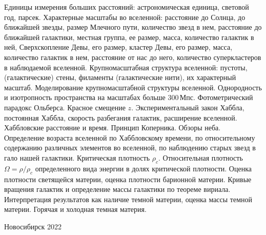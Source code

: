 \documentclass[12pt,pagesize,paper=192mm:108mm,landscape]{scrbook}
\begin{document}
\begin{titlepage}
  \vspace*{-0.5em}
  \begin{center}    

    



     \vfill

     \normalsize
     \begin{minipage}{0.95\linewidth}
       Единицы измерения больших расстояний: астрономическая единица,
       световой год, парсек. Характерные масштабы во вселенной:
       расстояние до Солнца, до ближайшей звезды, размер Млечного
       пути, количество звезд в нем, расстояние до ближайшей
       галактики, местная группа, ее размер, масса, количество
       галактик в ней, Сверхскопление Девы, его размер, кластер Девы,
       его размер, масса, количество галактик в нем, расстояние от нас
       до него, количество суперкластеров в наблюдаемой
       вселенной. Крупномасштабная структура вселенной: пустоты,
       (галактические) стены, филаменты (галактические нити), их
       характерный масштаб. Моделирование крупномасштабной структуры
       вселенной. Однородность и изотропность пространства на
       масштабах больше 300\,Мпс. Фотометрический парадокс
       Ольберса. Красное смещение $z$. Экспериментальный закон Хаббла,
       постоянная Хаббла, скорость разбегания галактик, расширение
       вселенной. Хаббловские расстояние и время. Принцип
       Коперника. Обзоры неба. Определение возраста вселенной по
       Хаббловскому времени, по относительному содержанию различных
       элементов во вселенной, по наблюдению старых звезд в гало нашей
       галактики. Критическая плотность $\rho_c$. Относительная
       плотность $\Omega=\rho/\rho_c$ определенного вида энергии в
       долях критической плотности. Оценка плотности светящейся
       материи, оценка плотности барионной материи. Кривые вращения
       галактик и определение массы галактики по теореме
       вириала. Интерпретация результатов как наличие темной материи,
       оценка массы темной материи. Горячая и холодная темная материя.
    \end{minipage}
    \vfill

    \normalsize \ccbysa\hspace{0.5em}  Новосибирск 2022
  \end{center}
\end{titlepage}
\end{document}
